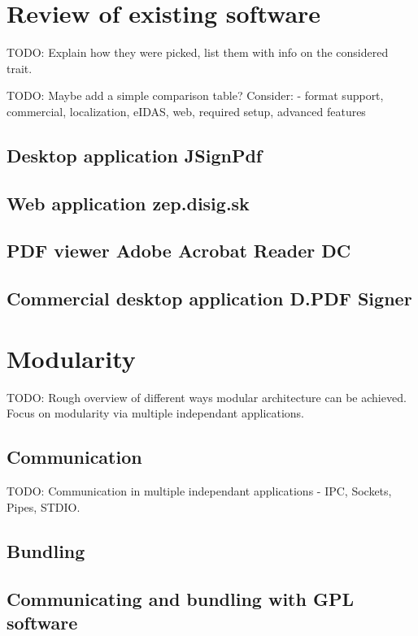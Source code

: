 \documentclass[thesismargins, english, thesislinespacing, twoside, openright, upjsfrontpage]{rnthesis}
\begin{document}
\section{Review of existing software}

TODO: Explain how they were picked, list them with info on the considered trait.

TODO: Maybe add a simple comparison table? Consider: - format support, commercial, localization, eIDAS, web, required setup, advanced features

\subsection{Desktop application JSignPdf}

\subsection{Web application zep.disig.sk}

\subsection{PDF viewer Adobe Acrobat Reader DC}

\subsection{Commercial desktop application D.PDF Signer}

\section{Modularity}

TODO: Rough overview of different ways modular architecture can be achieved. Focus on modularity via multiple independant applications.

\subsection{Communication}

TODO: Communication in multiple independant applications - IPC, Sockets, Pipes, STDIO.

\subsection{Bundling}

\subsection{Communicating and bundling with GPL software}
\end{document}
